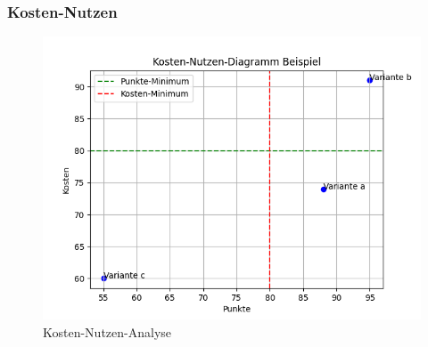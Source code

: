 
\begin{flushleft}
    \subsubsection{Kosten-Nutzen}
    \begin{figure}[H]
        \centering
        \includegraphics[width=1\linewidth]{source/cost_benefit_diagram/cost_benefit_diagram}
        \caption{Kosten-Nutzen-Analyse}
        \label{fig:cost_benefit_diagram}
    \end{figure}
\end{flushleft}